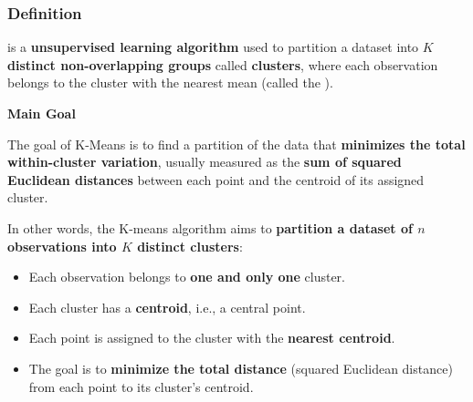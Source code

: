 \subsubsection{Definition}

 is a \textbf{unsupervised learning algorithm} used to partition a dataset into $K$ \textbf{distinct non-overlapping groups} called \textbf{clusters}, where each observation belongs to the cluster with the nearest mean (called the ).

\highspace
\begin{flushleft}
    \textcolor{Green3}{ \textbf{Main Goal}}
\end{flushleft}
The goal of K-Means is to find a partition of the data that \textbf{minimizes the total within-cluster variation}, usually measured as the \textbf{sum of squared Euclidean distances} between each point and the centroid of its assigned cluster.

\highspace
In other words, the K-means algorithm aims to \textbf{partition a dataset of $n$ observations into $K$ distinct clusters}:
\begin{itemize}
    \item Each observation belongs to \textbf{one and only one} cluster.
    \item Each cluster has a \textbf{centroid}, i.e., a central point.
    \item Each point is assigned to the cluster with the \textbf{nearest centroid}.
    \item The goal is to \textbf{minimize the total distance} (squared Euclidean distance) from each point to its cluster's centroid.
\end{itemize}

